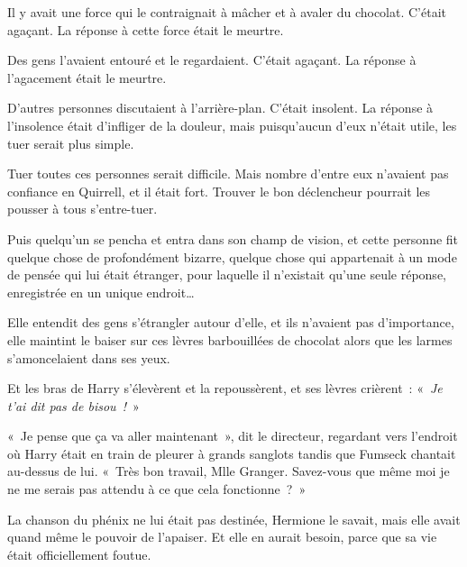 \later

Il y avait une force qui le contraignait à mâcher et à avaler du chocolat.
C'était agaçant.
La réponse à cette force était le meurtre.

Des gens l'avaient entouré et le regardaient.
C'était agaçant.
La réponse à l'agacement était le meurtre.

D'autres personnes discutaient à l'arrière-plan.
C'était insolent.
La réponse à l'insolence était d'infliger de la douleur, mais puisqu'aucun d'eux n'était utile, les tuer serait plus simple.

Tuer toutes ces personnes serait difficile.
Mais nombre d'entre eux n'avaient pas confiance en Quirrell, et il était fort.
Trouver le bon déclencheur pourrait les pousser à tous s'entre-tuer.

Puis quelqu'un se pencha et entra dans son champ de vision, et cette personne fit quelque chose de profondément bizarre, quelque chose qui appartenait à un mode de pensée qui lui était étranger, pour laquelle il n'existait qu'une seule réponse, enregistrée en un unique endroit…

\later

Elle entendit des gens s'étrangler autour d'elle, et ils n'avaient pas d'importance, elle maintint le baiser sur ces lèvres barbouillées de chocolat alors que les larmes s'amoncelaient dans ses yeux.

Et les bras de Harry s'élevèrent et la repoussèrent, et ses lèvres crièrent~: «~\emph{Je t'ai dit pas de bisou~!}~»

\later

«~Je pense que ça va aller maintenant~», dit le directeur, regardant vers l'endroit où Harry était en train de pleurer à grands sanglots tandis que Fumseck chantait au-dessus de lui.
«~Très bon travail, Mlle Granger.
Savez-vous que même moi je ne me serais pas attendu à ce que cela fonctionne~?~»

La chanson du phénix ne lui était pas destinée, Hermione le savait, mais elle avait quand même le pouvoir de l'apaiser.
Et elle en aurait besoin, parce que sa vie était officiellement foutue.
